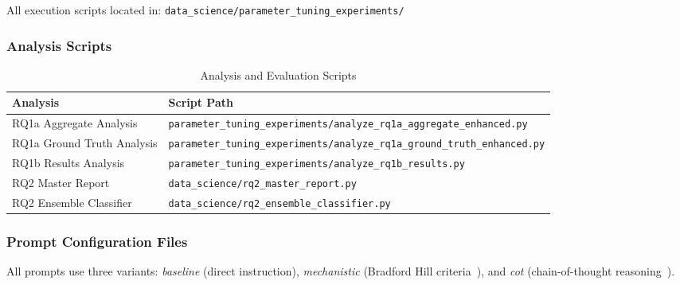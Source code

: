 All execution scripts located in: \texttt{data\_science/parameter\_tuning\_experiments/}

\subsubsection{Analysis Scripts}

\begin{table}[H]
\centering
\caption{Analysis and Evaluation Scripts}
\label{tab:analysis_scripts}
\footnotesize
\begin{tabularx}{\textwidth}{@{}l X@{}}
\toprule
\textbf{Analysis} & \textbf{Script Path} \\
\midrule
RQ1a Aggregate Analysis & \texttt{parameter\_tuning\_experiments/analyze\_rq1a\_aggregate\_enhanced.py} \\
RQ1a Ground Truth Analysis & \texttt{parameter\_tuning\_experiments/analyze\_rq1a\_ground\_truth\_enhanced.py} \\
RQ1b Results Analysis & \texttt{parameter\_tuning\_experiments/analyze\_rq1b\_results.py} \\
RQ2 Master Report & \texttt{data\_science/rq2\_master\_report.py} \\
RQ2 Ensemble Classifier & \texttt{data\_science/rq2\_ensemble\_classifier.py} \\
\bottomrule
\end{tabularx}
\end{table}

\subsubsection{Prompt Configuration Files}

All prompts use three variants: \textit{baseline} (direct instruction), \textit{mechanistic} (Bradford Hill criteria~\cite{shimonovich2020bradford}), and \textit{cot} (chain-of-thought reasoning~\cite{kojima2022large}).

